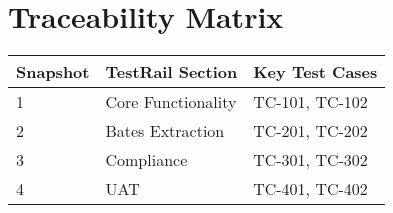 \documentclass{article}
\begin{document}
\section*{Traceability Matrix}
\begin{tabular}{|l|l|l|}
\hline
\textbf{Snapshot} & \textbf{TestRail Section} & \textbf{Key Test Cases} \\ \hline
1 & Core Functionality & TC-101, TC-102 \\ \hline
2 & Bates Extraction & TC-201, TC-202 \\ \hline
3 & Compliance & TC-301, TC-302 \\ \hline
4 & UAT & TC-401, TC-402 \\ \hline
\end{tabular}
\end{document}
